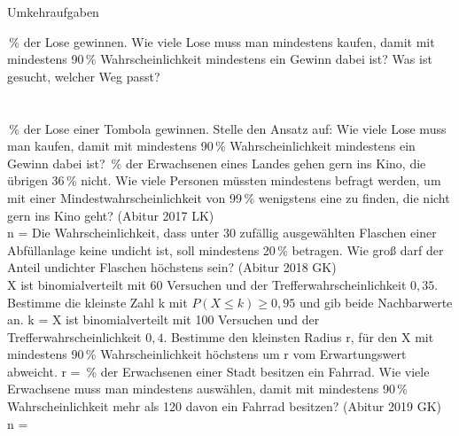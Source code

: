 \setcounter{aufgabe}{18}

\begin{aufgabe}{Umkehraufgaben}
\begin{teile}
\,\% der Lose gewinnen. Wie viele Lose muss man mindestens kaufen, damit mit mindestens 90\,\% Wahrscheinlichkeit mindestens ein Gewinn dabei ist? Was ist gesucht, welcher Weg passt?  \\  \\  \\ 
\,\% der Lose einer Tombola gewinnen. Stelle den Ansatz auf: Wie viele Lose muss man kaufen, damit mit mindestens 90\,\% Wahrscheinlichkeit mindestens ein Gewinn dabei ist?
\,\% der Erwachsenen eines Landes gehen gern ins Kino, die übrigen 36\,\% nicht. Wie viele Personen müssten mindestens befragt werden, um mit einer Mindestwahrscheinlichkeit von 99\,\% wenigstens eine zu finden, die nicht gern ins Kino geht? \hfill (Abitur 2017 LK) \\ n = \leerfeld
\teil Die Wahrscheinlichkeit, dass unter 30 zufällig ausgewählten Flaschen einer Abfüllanlage keine undicht ist, soll mindestens 20\,\% betragen. Wie groß darf der Anteil undichter Flaschen höchstens sein? \hfill (Abitur 2018 GK) \\ \leerfeld
\teil X ist binomialverteilt mit 60 Versuchen und der Trefferwahrscheinlichkeit $0{,}35$. Bestimme die kleinste Zahl k mit $P(X \le k) \ge 0{,}95$ und gib beide Nachbarwerte an. k = \leerfeld
\teil X ist binomialverteilt mit 100 Versuchen und der Trefferwahrscheinlichkeit $0{,}4$. Bestimme den kleinsten Radius r, für den X mit mindestens 90\,\% Wahrscheinlichkeit höchstens um r vom Erwartungswert abweicht. r = \leerfeld
{}\,\% der Erwachsenen einer Stadt besitzen ein Fahrrad. Wie viele Erwachsene muss man mindestens auswählen, damit mit mindestens 90\,\% Wahrscheinlichkeit mehr als 120 davon ein Fahrrad besitzen? \hfill (Abitur 2019 GK) \\ n = \leerfeld

\end{teile}
\end{aufgabe}
